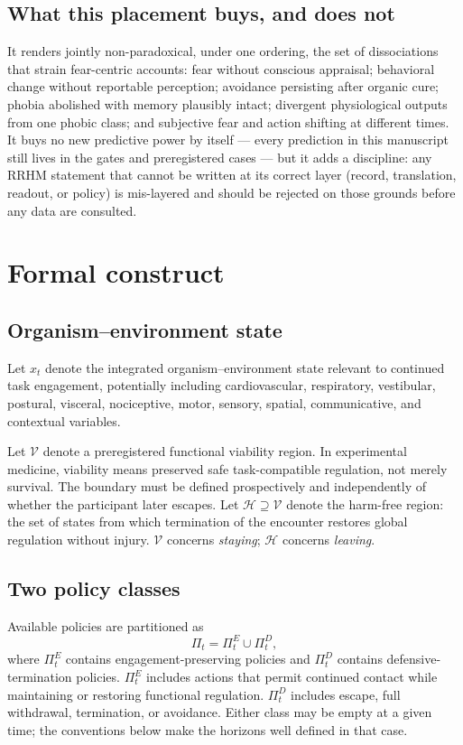 \documentclass[9pt,twocolumn]{article}
\newcommand{\Vset}{\mathcal{V}}
\newcommand{\Hset}{\mathcal{H}}
\begin{document}
\subsection{What this placement buys, and does not}
It renders jointly non-paradoxical, under one ordering, the set of dissociations that strain fear-centric accounts: fear without conscious appraisal; behavioral change without reportable perception; avoidance persisting after organic cure; phobia abolished with memory plausibly intact; divergent physiological outputs from one phobic class; and subjective fear and action shifting at different times. It buys no new predictive power by itself --- every prediction in this manuscript still lives in the gates and preregistered cases --- but it adds a discipline: any RRHM statement that cannot be written at its correct layer (record, translation, readout, or policy) is mis-layered and should be rejected on those grounds before any data are consulted.

\section{Formal construct}
\label{sec:formal}
\subsection{Organism--environment state}
Let $x_t$ denote the integrated organism--environment state relevant to continued task engagement, potentially including cardiovascular, respiratory, vestibular, postural, visceral, nociceptive, motor, sensory, spatial, communicative, and contextual variables.

Let $\Vset$ denote a preregistered functional viability region. In experimental medicine, viability means preserved safe task-compatible regulation, not merely survival. The boundary must be defined prospectively and independently of whether the participant later escapes. Let $\Hset\supseteq\Vset$ denote the harm-free region: the set of states from which termination of the encounter restores global regulation without injury. $\Vset$ concerns \emph{staying}; $\Hset$ concerns \emph{leaving}.

\subsection{Two policy classes}
Available policies are partitioned as
\[
\Pi_t=\Pi_t^E\cup\Pi_t^D,
\]
where $\Pi_t^E$ contains engagement-preserving policies and $\Pi_t^D$ contains defensive-termination policies. $\Pi_t^E$ includes actions that permit continued contact while maintaining or restoring functional regulation. $\Pi_t^D$ includes escape, full withdrawal, termination, or avoidance. Either class may be empty at a given time; the conventions below make the horizons well defined in that case.
\end{document}
